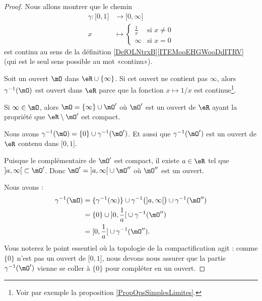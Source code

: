\begin{proof}
	Nous allons montrer que le chemin
	\begin{equation}
		\begin{aligned}
			\gamma\colon \mathopen[ 0 , 1 \mathclose] & \to \mathopen[ 0 , \infty \mathclose]      \\
			x                                         & \mapsto \begin{cases}
				                                                    \frac{1}{ x } & \text{si } x\neq 0 \\
				                                                    \infty        & \text{si } x=0
			                                                    \end{cases}
		\end{aligned}
	\end{equation}
	est continu au sens de la définition \ref{DefOLNtrxB}\ref{ITEMooEHGWooDdITRV} (qui est le seul sens possible au mot «continu»).

	Soit un ouvert \( \mO\) dans \( \eR\cup\{ \infty \}\). Si cet ouvert ne contient pas \( \infty\), alors \( \gamma^{-1}(\mO)\) est ouvert dans \( \eR\) parce que la fonction \( x\mapsto 1/x\) est continue\footnote{Voir par exemple la proposition \ref{PropOpsSimplesLimites}.}.

	Si \( \infty\in\mO\), alors \( \mO=\{ \infty \}\cup \mO'\) où \( \mO'\) est un ouvert de \( \eR\) ayant la propriété que \( \eR\setminus \mO'\) est compact.

	Nous avons \( \gamma^{-1}(\mO)=\{ 0 \}\cup\gamma^{-1}(\mO')\). Et aussi que \( \gamma^{-1}(\mO')\) est un ouvert de \( \eR\) contenu dans \( \mathopen[ 0 , 1 \mathclose]\).

	Puisque le complémentaire de \( \mO'\) est compact, il existe \( a\in \eR\) tel que \( \mathopen] a , \infty \mathclose[\subset \mO'\). Donc \( \mO'=\mathopen] a , \infty \mathclose[\cup\mO''\) où \( \mO''\) est un ouvert.

	Nous avons :
	\begin{subequations}
		\begin{align}
			\gamma^{-1}(\mO) & =\{ \gamma^{-1}(\infty) \}\cup \gamma^{-1}\big( \mathopen] a , \infty \mathclose[ \big)\cup \gamma^{-1}(\mO'') \\
			                 & =\{ 0 \}\cup\mathopen] 0 , \frac{1}{  a } \mathclose[\cup\gamma^{-1}(\mO'')                                    \\
			                 & =\mathopen[ 0 , \frac{1}{ a } \mathclose[\cup\gamma^{-1}(\mO'').
		\end{align}
	\end{subequations}
	Vous noterez le point essentiel où la topologie de la compactification agit : comme \( \{0\}\) n'est pas un ouvert de \( \mathopen[ 0 , 1 \mathclose]\), nous devons nous assurer que la partie \( \gamma^{-1}(\mO')\) vienne se coller à \( \{0\}\) pour compléter en un ouvert.


\end{proof}
